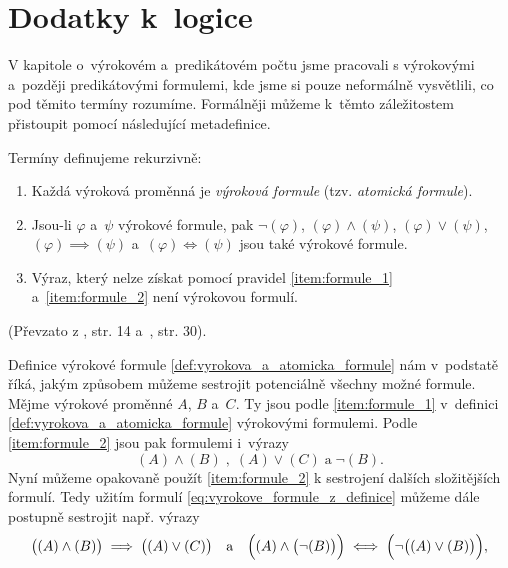 \chapter{Dodatky k~logice}\label{chap:dodatky_k_logice}
V kapitole o~výrokovém a~predikátovém počtu jsme pracovali s výrokovými a~později predikátovými formulemi, kde jsme si pouze neformálně vysvětlili, co pod těmito termíny rozumíme. Formálněji můžeme k~těmto záležitostem přistoupit pomocí následující metadefinice.
\begin{definition}\label{def:vyrokova_a_atomicka_formule}
    Termíny definujeme rekurzivně:
    \begin{enumerate}[label=(\roman*)]
        \item\label{item:formule_1} Každá výroková proměnná je \emph{výroková formule} (tzv. \emph{atomická formule}).
        \item\label{item:formule_2} Jsou-li $\varphi$ a~$\psi$ výrokové formule, pak $\neg (\varphi)$, $(\varphi) \land (\psi)$, $(\varphi) \lor (\psi)$, $(\varphi) \implies (\psi)$ a~$(\varphi) \iff (\psi)$ jsou také výrokové formule.
        \item\label{item:formule_3} Výraz, který nelze získat pomocí pravidel \ref{item:formule_1} a~\ref{item:formule_2} není výrokovou formulí.
    \end{enumerate}
\end{definition}
(Převzato z \cite{Fuchs2003}, str. 14 a~\cite{BalcarStepanek1986}, str. 30).\par
Definice výrokové formule \ref{def:vyrokova_a_atomicka_formule} nám v~podstatě říká, jakým způsobem můžeme sestrojit potenciálně všechny možné formule. Mějme výrokové proměnné $A$, $B$ a~$C$. Ty jsou podle \ref{item:formule_1} v~definici \ref{def:vyrokova_a_atomicka_formule} výrokovými formulemi. Podle \ref{item:formule_2} jsou pak formulemi i~výrazy
\begin{equation}\label{eq:vyrokove_formule_z_definice}
    (A) \land (B)\;,\;(A) \lor (C)\;\text{a}\;\neg(B).
\end{equation}
Nyní můžeme opakovaně použít \ref{item:formule_2} k sestrojení dalších složitějších formulí. Tedy užitím formulí \eqref{eq:vyrokove_formule_z_definice} můžeme dále postupně sestrojit např. výrazy
\begin{equation*}
    \bigl((A) \land (B)\bigr) \implies \bigl((A) \lor (C)\bigr)\quad\text{a}\quad\Bigl((A) \land \bigl(\neg(B)\bigr)\Bigr) \iff \Bigl(\neg\bigl((A) \lor (B)\bigr)\Bigr),
\end{equation*}
